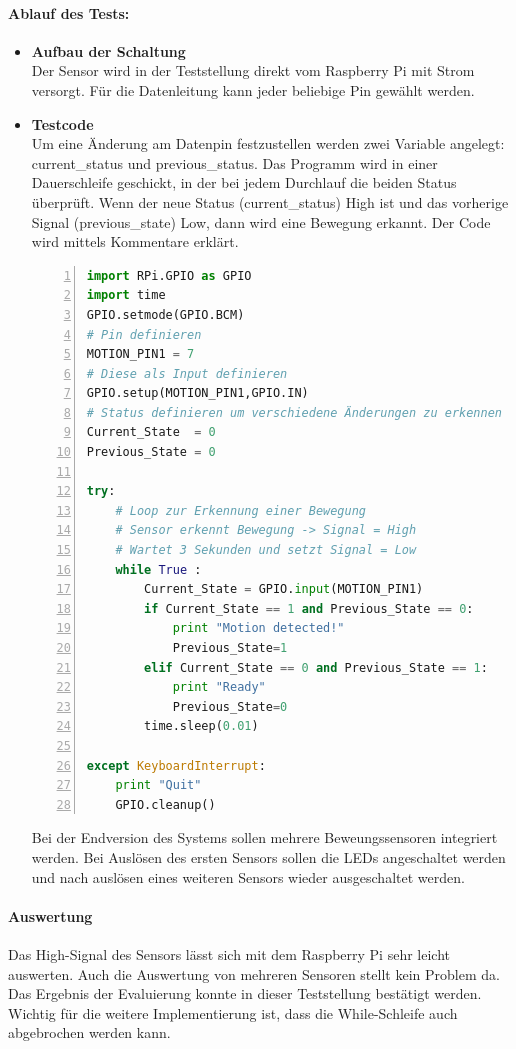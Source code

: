 \paragraph{Ablauf des Tests:}
\begin{itemize}
\item \textbf{Aufbau der Schaltung} \\
Der Sensor wird in der Teststellung direkt vom Raspberry Pi mit Strom versorgt. Für die Datenleitung kann jeder beliebige Pin gewählt werden. 
\item \textbf{Testcode} \\
Um eine Änderung am Datenpin festzustellen werden zwei Variable angelegt: current\_status und previous\_status. Das Programm wird in einer Dauerschleife geschickt, in der bei jedem Durchlauf die beiden Status überprüft. Wenn der neue Status (current\_status) High ist und das vorherige Signal (previous\_state) Low, dann wird eine Bewegung erkannt. Der Code wird mittels Kommentare erklärt.	

\begin{lstlisting}[caption = Testcode zur Bewegungserkennung mit Sensor, language=python, frame=single, breaklines=true,columns=fullflexible, commentstyle=\color{gray}\upshape, captionpos=b, numbers = left]
import RPi.GPIO as GPIO
import time
GPIO.setmode(GPIO.BCM)
# Pin definieren
MOTION_PIN1 = 7
# Diese als Input definieren
GPIO.setup(MOTION_PIN1,GPIO.IN)
# Status definieren um verschiedene Änderungen zu erkennen
Current_State  = 0
Previous_State = 0

try:
	# Loop zur Erkennung einer Bewegung
	# Sensor erkennt Bewegung -> Signal = High
	# Wartet 3 Sekunden und setzt Signal = Low
	while True :
		Current_State = GPIO.input(MOTION_PIN1)
		if Current_State == 1 and Previous_State == 0:
			print "Motion detected!"
			Previous_State=1
		elif Current_State == 0 and Previous_State == 1:
			print "Ready"
			Previous_State=0
		time.sleep(0.01)
	
except KeyboardInterrupt:
	print "Quit"
	GPIO.cleanup()
\end{lstlisting}
Bei der Endversion des Systems sollen mehrere Beweungssensoren integriert werden. Bei Auslösen des ersten Sensors sollen die LEDs angeschaltet werden und nach auslösen eines weiteren Sensors wieder ausgeschaltet werden.  
\end{itemize}

\paragraph{Auswertung}
Das High-Signal des Sensors lässt sich mit dem Raspberry Pi sehr leicht auswerten. Auch die Auswertung von mehreren Sensoren stellt kein Problem da. Das Ergebnis der Evaluierung konnte in dieser Teststellung bestätigt werden. Wichtig für die weitere Implementierung ist, dass die While-Schleife auch abgebrochen werden kann. 

